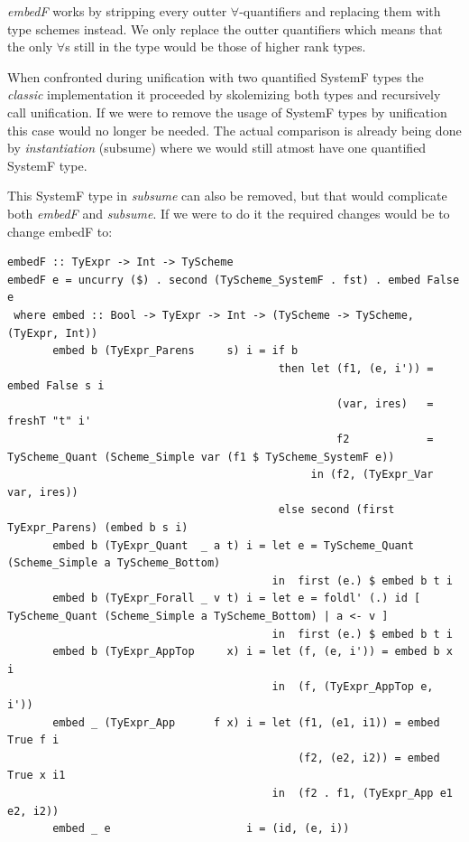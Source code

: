 \documentclass[12pt, a4paper, oneside]{article}
\begin{document}
\textit{embedF} works by stripping every outter $\forall$-quantifiers and replacing them with type schemes instead. We only replace the outter quantifiers which means that the only $\forall$s still in the type would be those of higher rank types.

When confronted during unification with two quantified SystemF types the \textit{classic} implementation it proceeded by skolemizing both types and recursively call unification. If we were to remove the usage of SystemF types by unification this case would no longer be needed. The actual comparison is already being done by \textit{instantiation} (subsume) where we would still atmost have one quantified SystemF type. 

This SystemF type in \textit{subsume} can also be removed, but that would complicate both \textit{embedF} and \textit{subsume}. If we were to do it the required changes would be to change embedF to:

\begin{lstlisting}
embedF :: TyExpr -> Int -> TyScheme
embedF e = uncurry ($) . second (TyScheme_SystemF . fst) . embed False e
 where embed :: Bool -> TyExpr -> Int -> (TyScheme -> TyScheme, (TyExpr, Int))
       embed b (TyExpr_Parens     s) i = if b 
                                          then let (f1, (e, i')) = embed False s i
                                                   (var, ires)   = freshT "t" i'
                                                   f2            = TyScheme_Quant (Scheme_Simple var (f1 $ TyScheme_SystemF e))
                                               in (f2, (TyExpr_Var var, ires))
                                          else second (first TyExpr_Parens) (embed b s i)
       embed b (TyExpr_Quant  _ a t) i = let e = TyScheme_Quant (Scheme_Simple a TyScheme_Bottom)
                                         in  first (e.) $ embed b t i
       embed b (TyExpr_Forall _ v t) i = let e = foldl' (.) id [ TyScheme_Quant (Scheme_Simple a TyScheme_Bottom) | a <- v ] 
                                         in  first (e.) $ embed b t i
       embed b (TyExpr_AppTop     x) i = let (f, (e, i')) = embed b x i
                                         in  (f, (TyExpr_AppTop e, i'))
       embed _ (TyExpr_App      f x) i = let (f1, (e1, i1)) = embed True f i
                                             (f2, (e2, i2)) = embed True x i1
                                         in  (f2 . f1, (TyExpr_App e1 e2, i2))
       embed _ e                     i = (id, (e, i))
\end{lstlisting}
\end{document}
